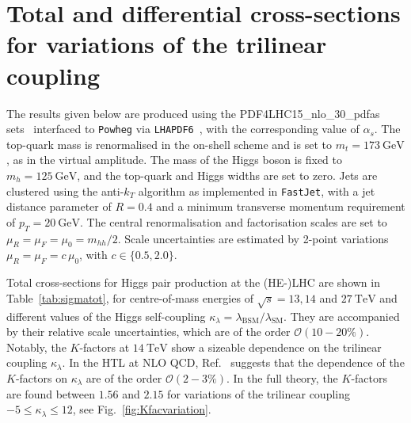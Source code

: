 \documentclass[a4paper]{jpconf}
\newcommand{\GeV}{\ensuremath{\mathrm{\:GeV}}}
\newcommand{\TeV}{\ensuremath{\mathrm{\:TeV}}}
\newcommand{\chhh}{\ensuremath{\kappa_{\lambda}}}
\begin{document}
\section{Total and differential cross-sections for variations of the trilinear coupling}

The results given below are produced using the PDF4LHC15\_nlo\_30\_pdfas sets~\cite{Butterworth:2015oua,CT14,MMHT14,NNPDF} interfaced to \texttt{Powheg} via \texttt{LHAPDF6}~\cite{Buckley:2014ana}, with the corresponding value of $\alpha_s$. The top-quark mass is renormalised in the on-shell scheme and is set to $m_t=173 \GeV$, as in the virtual amplitude. The mass of the Higgs boson is fixed to $m_h=125 \GeV$, and the top-quark and Higgs widths are set to zero. Jets are clustered using the anti-$k_T$ algorithm as implemented in \texttt{FastJet}, with a jet distance parameter of $R=0.4$ and a minimum transverse momentum requirement of $p_{T} = 20 \GeV$. The central renormalisation and factorisation scales are set to $\mu_R = \mu_F = \mu_0 = m_{hh} / 2$. Scale uncertainties are estimated by 2-point variations $\mu_R = \mu_F = c\, \mu_0$, with $c \in \lbrace {0.5, 2.0} \rbrace$.

Total cross-sections for Higgs pair production at the (HE-)LHC are shown in Table~\ref{tab:sigmatot}, for centre-of-mass energies of $\sqrt{s}=13,14$ and $27 \TeV$ and different values of the Higgs self-coupling $\chhh = \lambda_{\mathrm{BSM}} / \lambda_{\mathrm{SM}}$. They are accompanied by their relative scale uncertainties, which are of the order $\mathcal{O}(10-20\%)$. Notably, the $K$-factors at $14 \TeV$ show a sizeable dependence on the trilinear coupling $\chhh$. In the HTL at NLO QCD, Ref.~\cite{Grober:2015cwa} suggests that the dependence of the $K$-factors on $\chhh$ are of the order $\mathcal{O}(2-3\%)$. In the full theory, the $K$-factors are found between $1.56$ and $2.15$ for variations of the trilinear coupling $-5 \leq \chhh \leq 12$, see Fig.~\ref{fig:Kfacvariation}. 
\end{document}
